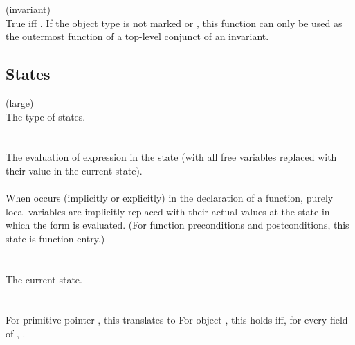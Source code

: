 \documentclass[preprint,nocopyrightspace]{sigplanconf}
\begin{document}
{{\noindent{} (invariant)\\
True iff .
If the object type is not marked 
or , this function can only be used as the
outermost function of a top-level conjunct of an invariant.

\subsection{States}
\vcc{\state} (large)\\
The type of states. 
\\\\
\\
The evaluation of expression  in the state  (with all
free variables replaced with their value in the current state).  
\\\\
When \vcc{\at} occurs (implicitly or explicitly) in the declaration of
a function, purely local variables are implicitly replaced with their
actual values at the state in which the form is evaluated. (For
function preconditions and postconditions, this state is function entry.)
\\\\
\vcc{\state \now()}\\
The current state. 
\\\\
\\
For primitive pointer , this translates to  
For object , this holds iff, for every field 
of , .

}}
\end{document}

